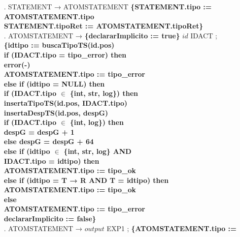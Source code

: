 \begin{tabbing}
    . STATEMENT → ATOMSTATEMENT \textbf{\{STATEMENT.tipo := ATOMSTATEMENT.tipo}\\
    \>                    \> \textbf{STATEMENT.tipoRet := ATOMSTATEMENT.tipoRet\}}\\
    . ATOMSTATEMENT → \textbf{\{declararImplicito := true\}} $id$ IDACT ;\\
    \>                    \> \textbf{\{idtipo := buscaTipoTS(id.pos)}\\
    \>                    \> \textbf{if (IDACT.tipo = tipo\_error) then}\\
    \>                    \> \> \textbf{error(-)}\\
    \>                    \> \> \textbf{ATOMSTATEMENT.tipo := tipo\_error}\\
    \>                    \> \textbf{else if (idtipo = NULL) then}\\
    \>                    \> \> \textbf{if (IDACT.tipo $\in$ \{int, str, log\}) then}\\
    \>                    \> \> \> \textbf{insertaTipoTS(id.pos, IDACT.tipo)}\\
    \>                    \> \> \> \textbf{insertaDespTS(id.pos, despG)}\\
    \>                    \> \> \> \textbf{if (IDACT.tipo $\in$ \{int, log\}) then}\\
    \>                    \> \> \>  \> \textbf{despG = despG + 1}\\
    \>                    \> \> \> \textbf{else despG = despG + 64}\\
    \>                    \> \> \textbf{else if (idtipo $\in$ \{int, str, log\} AND}\\
    \>                    \> \> \> \textbf{IDACT.tipo = idtipo) then}\\
    \>                    \> \> \> \textbf{ATOMSTATEMENT.tipo := tipo\_ok}\\
    \>                    \> \> \textbf{else if (idtipo = T → R AND T = idtipo) then}\\
    \>                    \> \> \> \textbf{ATOMSTATEMENT.tipo := tipo\_ok}\\
    \>                    \> \> \textbf{else}\\
    \>                    \> \> \textbf{ATOMSTATEMENT.tipo := tipo\_error}\\
    \>                    \> \textbf{declararImplicito := false\}}\\
    . ATOMSTATEMENT → $output$ EXP1 ; \textbf{\{ATOMSTATEMENT.tipo := }\\

\end{tabbing}
